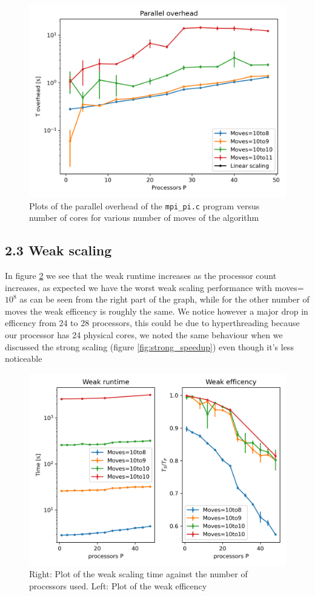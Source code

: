 \documentclass[a4paper]{article}
\begin{document}
\begin{figure}[h]
    \centering
    \includegraphics[scale=0.7]{parallel_overhead_time.png}
    \caption{Plots of the parallel overhead of the \texttt{mpi\_pi.c} program versus number of cores for various number of moves of the algorithm}
    \label{fig:parallel_overhead_time}
\end{figure}

\subsection*{2.3 Weak scaling}
In figure \ref{fig:weak_scaling} we see that the weak runtime increases as the processor count increases, as expected we have the worst weak scaling performance with moves=$10^8$ as can be seen from the right part of the graph, while for the other number of moves the weak efficency is roughly the same. We notice however a major drop in efficency from 24 to 28 processors, this could be due to hyperthreading because our processor has 24 physical cores, we noted the same behaviour when we discussed the strong scaling (figure \ref{fig:strong_speedup}) even though it's less noticeable

\begin{figure}[h]
    \centering
    \includegraphics[scale=0.9]{weak_scaling.png}
    \caption{Right: Plot of the weak scaling time against the number of processors used. Left: Plot of the weak efficency}
    \label{fig:weak_scaling}
\end{figure}
\end{document}
